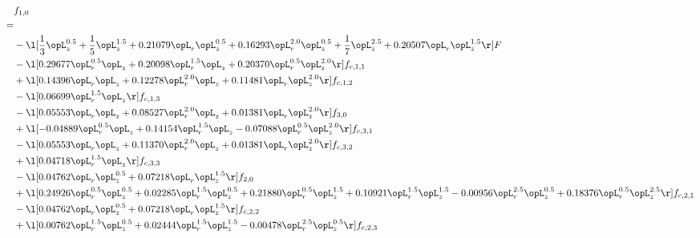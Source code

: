 \begin{alignat}{2} 
\label{eq:f_10_2} 
& f_{1,0} \nonumber \\ 
 = \\ 
& - \l[ \frac{1}{3} \opL_z^{0.5} + \frac{1}{5} \opL_z^{1.5} +  0.21079 \opL_r \opL_z^{0.5} +  0.16293 \opL_r^{2.0} \opL_z^{0.5} + \frac{1}{7} \opL_z^{2.5} +  0.20507 \opL_r \opL_z^{1.5}  \r] F \nonumber \\ 
& - \l[  0.29677 \opL_r^{0.5} \opL_z +  0.20098 \opL_r^{1.5} \opL_z +  0.20370 \opL_r^{0.5} \opL_z^{2.0}  \r] f_{c,1,1} \nonumber \\ 
& + \l[  0.14396 \opL_r \opL_z +  0.12278 \opL_r^{2.0} \opL_z +  0.11481 \opL_r \opL_z^{2.0}  \r] f_{c,1,2} \nonumber \\ 
& - \l[  0.06699 \opL_r^{1.5} \opL_z  \r] f_{c,1,3} \nonumber \\ 
& - \l[  0.05553 \opL_r \opL_z +  0.08527 \opL_r^{2.0} \opL_z +  0.01381 \opL_r \opL_z^{2.0}  \r] f_{3,0} \nonumber \\ 
& + \l[  -0.04889 \opL_r^{0.5} \opL_z +  0.14154 \opL_r^{1.5} \opL_z   -0.07088 \opL_r^{0.5} \opL_z^{2.0}  \r] f_{c,3,1} \nonumber \\ 
& - \l[  0.05553 \opL_r \opL_z +  0.11370 \opL_r^{2.0} \opL_z +  0.01381 \opL_r \opL_z^{2.0}  \r] f_{c,3,2} \nonumber \\ 
& + \l[  0.04718 \opL_r^{1.5} \opL_z  \r] f_{c,3,3} \nonumber \\ 
& - \l[  0.04762 \opL_r \opL_z^{0.5} +  0.07218 \opL_r \opL_z^{1.5}  \r] f_{2,0} \nonumber \\ 
& + \l[  0.24926 \opL_r^{0.5} \opL_z^{0.5} +  0.02285 \opL_r^{1.5} \opL_z^{0.5} +  0.21880 \opL_r^{0.5} \opL_z^{1.5} +  0.10921 \opL_r^{1.5} \opL_z^{1.5}   -0.00956 \opL_r^{2.5} \opL_z^{0.5} +  0.18376 \opL_r^{0.5} \opL_z^{2.5}  \r] f_{c,2,1} \nonumber \\ 
& - \l[  0.04762 \opL_r \opL_z^{0.5} +  0.07218 \opL_r \opL_z^{1.5}  \r] f_{c,2,2} \nonumber \\ 
& + \l[  0.00762 \opL_r^{1.5} \opL_z^{0.5} +  0.02444 \opL_r^{1.5} \opL_z^{1.5}   -0.00478 \opL_r^{2.5} \opL_z^{0.5}  \r] f_{c,2,3} \nonumber \\ 
\end{alignat} 


